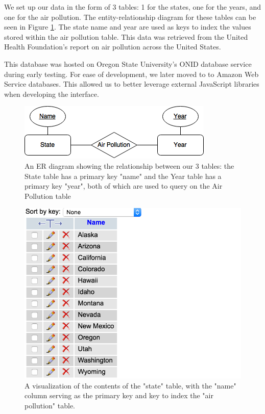 \documentclass[journal]{vgtc}                %
\begin{document}
We set up our data in the form of 3 tables: 1 for the states, one for the years, and one for the air pollution. The 
entity-relationship diagram for these tables can be seen in Figure \ref{fig:ERdiagram}. 
The state name and year are used as keys to index the values stored within the air pollution table. This data was 
retrieved from the United Health Foundation's report on air pollution across the United States.

This database was hosted on Oregon State University's ONID database service during early testing. For ease of development,
we later moved to to Amazon Web Service databases. This allowed us to better leverage external JavaScript libraries
when developing the interface.

\begin{figure}
 \centering %
 \includegraphics[width=\columnwidth]{cs458-ER-diagram-ass1.png}
 \caption{An ER diagram showing the relationship between our 3 tables: the State table has a primary key "name" and the Year table has a primary key "year", both of which are used to query on the Air Pollution table}
 \label{fig:ERdiagram}
\end{figure}


\begin{figure}
\centering
\includegraphics[width=\columnwidth]{state_db.png}
\caption{A visualization of the contents of the "state" table, with the "name" column serving as the primary key and key 
to index the "air pollution" table.}
\label{fig:stateDB}
\end{figure}
\end{document}
